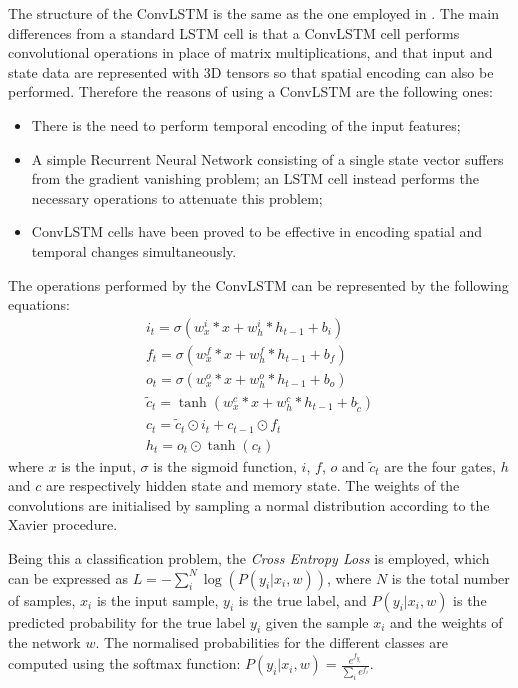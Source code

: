\documentclass[10pt,twocolumn,letterpaper]{article}
\begin{document}
The structure of the ConvLSTM is the same as the one employed in \cite{Ego-RNN}. The main differences from a standard LSTM cell is that a ConvLSTM cell performs convolutional operations in place of matrix multiplications, and that input and state data are represented with 3D tensors so that spatial encoding can also be performed.
Therefore the reasons of using a ConvLSTM are the following ones:
\begin{itemize}
	\item There is the need to perform temporal encoding of the input features;
	\item A simple Recurrent Neural Network consisting of a single state vector suffers from the gradient vanishing problem; an LSTM cell instead performs the necessary operations to attenuate this problem;
	\item ConvLSTM cells have been proved to be effective in encoding spatial and temporal changes simultaneously.
\end{itemize}
The operations performed by the ConvLSTM can be represented by the following equations:
\begin{equation*}
\begin{gathered}
i_t = \sigma(w_x^i * x + w_h^i * h_{t-1} + b_i) \\
f_t = \sigma(w_x^f * x + w_h^f * h_{t-1} + b_f) \\
o_t = \sigma(w_x^o * x + w_h^o * h_{t-1} + b_o)\\
\tilde{c}_t = \tanh(w_x^c * x + w_h^c * h_{t-1} + b_{\tilde{c}}) \\
c_t = \tilde{c}_t \odot i_t + c_{t-1} \odot f_t \\
h_t = o_t \odot \tanh(c_t)
\end{gathered}
\end{equation*}
where $x$ is the input, $\sigma$ is the sigmoid function, $i$, $f$, $o$ and $\tilde{c}_t$ are the four gates, $h$ and $c$ are respectively hidden state and memory state.
The weights of the convolutions are initialised by sampling a normal distribution according to the Xavier procedure.

Being this a classification problem, the \textit{Cross Entropy Loss} is employed, which can be expressed as ${L = -\sum_i^N{\log(P(y_i | x_i, w))}}$, where $N$ is the total number of samples, $x_i$ is the input sample, $y_i$ is the true label, and ${P(y_i | x_i, w)}$ is the predicted probability for the true label $y_i$ given the sample $x_i$ and the weights of the network $w$. The normalised probabilities for the different classes are computed using the softmax function: ${P(y_i | x_i, w) = \frac{e^{f_{y_i}}}{\sum_i e^{f_i}}}$.
\end{document}
